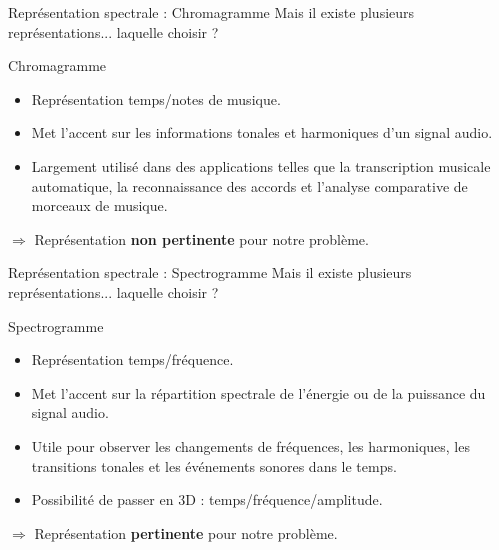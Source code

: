 \documentclass[compress,xcolor=table]{beamer}
\begin{document}
\begin{frame}{Représentation spectrale : Chromagramme}
    Mais il existe plusieurs représentations... laquelle choisir ?

    \begin{block}{Chromagramme}

        \begin{itemize}
            \item Représentation temps/notes de musique.
            \item Met l'accent sur les informations tonales et harmoniques d'un signal audio.
            \item Largement utilisé dans des applications telles que la transcription musicale automatique, la reconnaissance des accords et l'analyse comparative de morceaux de musique.
        \end{itemize}

    \end{block}

    $\Rightarrow$ Représentation \textbf{non pertinente} pour notre problème.

\end{frame}

\begin{frame}{Représentation spectrale : Spectrogramme}
    Mais il existe plusieurs représentations... laquelle choisir ?

    \begin{block}{Spectrogramme}

        \begin{itemize}
            \item Représentation temps/fréquence.
            \item Met l'accent sur la répartition spectrale de l'énergie ou de la puissance du signal audio.
            \item Utile pour observer les changements de fréquences, les harmoniques, les transitions tonales et les événements sonores dans le temps.
            \item Possibilité de passer en 3D : temps/fréquence/amplitude.
        \end{itemize}

    \end{block}

    $\Rightarrow$ Représentation \textbf{pertinente} pour notre problème.

\end{frame}
\end{document}
